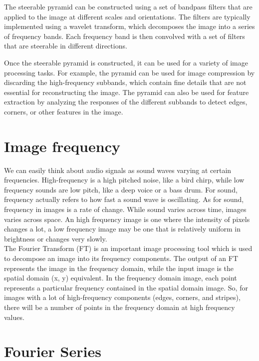 \documentclass{article}
\begin{document}
The steerable pyramid can be constructed using a set of bandpass filters that are applied to the image at different scales and orientations. The filters are typically implemented using a wavelet transform, which decomposes the image into a series of frequency bands. Each frequency band is then convolved with a set of filters that are steerable in different directions.

Once the steerable pyramid is constructed, it can be used for a variety of image processing tasks. For example, the pyramid can be used for image compression by discarding the high-frequency subbands, which contain fine details that are not essential for reconstructing the image. The pyramid can also be used for feature extraction by analyzing the responses of the different subbands to detect edges, corners, or other features in the image.

\newpage

\section*{Image frequency}

We can easily think about audio signals as sound waves varying at certain frequencies. High-frequency is a high pitched noise, like a bird chirp, while low frequency sounds are low pitch, like a deep voice or a bass drum. For sound, frequency actually refers to how fast a sound wave is oscillating. As for sound, frequency in images is a rate of change. While sound varies across time, images varies across space. An high frequency image is one where the intensity of pixels changes a lot, a low frequency image may be one that is relatively uniform in brightness or changes very slowly. \\

The Fourier Transform (FT) is an important image processing tool which is used to decompose an image into its frequency components. The output of an FT represents the image in the frequency domain, while the input image is the spatial domain (x, y) equivalent. In the frequency domain image, each point represents a particular frequency contained in the spatial domain image. So, for images with a lot of high-frequency components (edges, corners, and stripes), there will be a number of points in the frequency domain at high frequency values.

\section*{Fourier Series}
\end{document}
